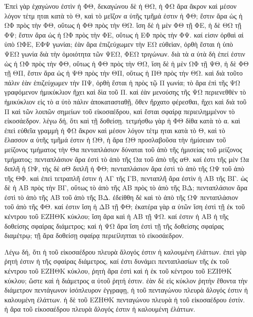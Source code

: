 \begin{Parallel}{}{}
{{\greekfont Ἐπεὶ γὰρ ἑχαγώνου ἐστὶν ἡ ΦΘ, δεκαγώνου δὲ ἡ ΘΩ,
ἡ ΦΩ ἄρα ἄκρον καὶ μέσον λόγον τέτμ ηται κατὰ τὸ Θ,
καὶ τὸ μεῖζον α ὐτῆς τμῆμά ἐστιν ἡ ΦΘ; ἔστιν
ἄρα ὡς ἡ ΩΦ πρὸς τὴν ΦΘ, οὕτως ἡ ΦΘ πρὸς
τὴν ΘΩ. ἴση δὲ ἡ μὲν ΦΘ τῇ ΦΕ, ἡ δὲ ΘΩ
τῇ ΦΨ; ἔστιν ἄρα ὡς ἡ ΩΦ πρὸς τὴν ΦΕ, οὕτως
ἡ ΕΦ πρὸς τὴν ΦΨ. καί εἰσιν ὀρθαὶ αἱ ὑπὸ
ΩΦΕ, ΕΦΨ γωνίαι; ἐὰν ἄρα ἐπιζεύχωμεν τὴν ΕΩ εὐθεὶαν,
ὀρθὴ ἔσται ἡ ὑπὸ ΨΕΩ γωνία διὰ τὴν ὁμοιότητα
τῶν ΨΕΩ, ΦΕΩ τριγώνων. διὰ τὰ α ὐτὰ δὴ ἐπεί
ἐστιν ὡς ἡ ΩΦ πρὸς τὴν ΦΘ, οὕτως ἡ ΦΘ πρὸς
τὴν ΘΩ, ἴση δὲ ἡ μὲν ΩΦ τῇ ΨΘ, ἡ δὲ ΦΘ τῇ ΘΠ, ἔστιν ἄρα ὡς ἡ ΨΘ πρὸς τὴν ΘΠ, οὕτως ἡ ΠΘ πρὸς τὴν ΘΩ. καὶ διὰ τοῦτο
πάλιν ἐὰν ἐπιζεύχωμεν τὴν ΠΨ, ὀρθὴ ἔσται ἡ πρὸς τῷ
Π γωνία; τὸ ἄρα ἐπὶ τῆς ΨΩ γραφόμενον ἡμικύκλιον
ἥχει καὶ
δὶα τοῦ Π. καὶ ἐὰν μενούσης τῆς ΨΩ περιενεθθὲν
τὸ ἡμικύκλιον εἰς τὸ α ὐτὸ πάλιν ἀποκατασταθῇ,
ὅθεν ἤρχατο φέρεσθαι, ἥχει καὶ διὰ τοῦ Π καὶ 	τῶν
λοιπῶν σημείων τοῦ εἰκοσαέδρου, καὶ ἔσται σφαίρᾳ
περιειλημμένον τὸ εἰκοσάεδρον. λέγω δή, ὅτι καὶ τῇ
δοθείσῃ. τετμήσθω γὰρ ἡ ΦΘ δίθα κατὰ τὸ α. καὶ ἐπεὶ
εὐθεῖα γραμμὴ ἡ ΦΩ ἄκρον καὶ μέσον λόγον τέτμ ηται
κατὰ τὸ Θ, καὶ τὸ ἔλασσον α ὐτῆς τμῆμά ἐστιν ἡ ΩΘ,  ἡ ἄρα
ΩΘ προσλαβοῦσα 
τὴν ἡμίσειαν τοῦ μείζονος τμήματος τὴν Θα πενταπλάσιον
δύναται τοῦ ἀπὸ τῆς
ἡμισείας τοῦ μείζονος τμήματος; πενταπλάσιον ἄρα
ἐστὶ τὸ ἀπὸ τῆς Ωα τοῦ ἀπὸ τῆς αΘ. καί ἐστι τῆς
μὲν Ωα διπλῆ ἡ ΩΨ, τὴς δὲ αΘ διπλῆ ἡ ΦΘ;
πενταπλάσιον ἄρα ἐστὶ τὸ ἀπὸ τῆς ΩΨ τοῦ  ἀπὸ
τῆς ΘΦ. καὶ ἐπεὶ τετραπλῆ ἐστιν ἡ ΑΓ τῆς ΓΒ, πενταπλῆ
ἄρα ἐστὶν ἡ ΑΒ τῆς ΒΓ. ὡς δὲ ἡ ΑΒ πρὸς τὴν ΒΓ,
οὕτως τὸ ἀπὸ τῆς ΑΒ πρὸς τὸ ἀπὸ τῆς ΒΔ;
πενταπλάσιον ἄρα ἐστὶ τὸ ἀπὸ τῆς ΑΒ τοῦ ἀπὸ
τῆς ΒΔ. ἐδείθθη δὲ καὶ τὸ ἀπὸ τῆς ΩΨ πενταπλάσιον
τοῦ ἀπὸ τῆς ΦΘ. καί ἐστιν ἴση ἡ ΔΒ τῇ ΦΘ;
ἑκατέρα γὰρ α ὐτῶν ἴση ἐστὶ τῇ ἐκ τοῦ κέντρου τοῦ
ΕΖΗΘΚ κύκλου; ἴση ἄρα καὶ ἡ ΑΒ τῇ ΨΩ. καί
ἐστιν ἡ ΑΒ ἡ τῆς δοθείσης σφαίρας διάμετρος; καὶ
ἡ ΨΩ ἄρα ἴση ἐστὶ τῇ τῆς δοθείσης σφαίρας
διαμέτρῳ; τῇ ἄρα δοθείσῃ σφαίρᾳ περιείληπται τὸ
εἰκοσάεδρον.}

{\greekfont Λέγω δή, ὅτι ἡ τοῦ εἰκοσαέδρου πλευρὰ ἄλογός
ἐστιν ἡ καλουμένη ἐλάττων. ἐπεὶ γὰρ ῥητή ἐστιν ἡ τῆς
σφαίρας διάμετρος, καί ἐστι δυνάμει πενταπλασίων
τῆς ἐκ τοῦ κέντρου τοῦ ΕΖΗΘΚ κύκλου,
ῥητὴ ἄρα ἐστὶ καὶ ἡ ἑκ τοῦ κέντρου τοῦ ΕΖΗΘΚ κύκλου;
ὥστε καὶ ἡ διάμετρος α ὐτοῦ ῥητή ἐστιν. ἐὰν δὲ εἰς
κύκλον ῥητὴν ἔθοντα τὴν διάμετρον πεντάγωνον ἰσόπλευρον ἐγγραφῃ,
ἡ τοῦ πενταγώνου πλευρὰ ἄλογός ἐστιν ἡ καλουμένη ἐλάττων.
ἡ δὲ τοῦ ΕΖΗΘΚ
πενταγώνου πλευρὰ ἡ τοῦ εἰκοσαέδρου ἐστίν. ἡ ἄρα τοῦ
είκοσαέδρου πλευρὰ ἄλογός ἐστιν ἡ καλουμένη
ἐλάττων.}}

\end{Parallel}
